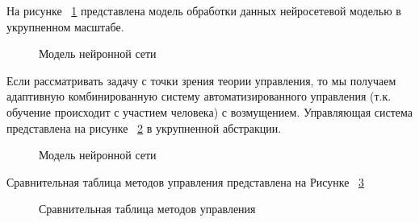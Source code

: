 На рисунке ~\cref{fig:NNproc} представлена модель обработки данных нейросетевой моделью в укрупненном масштабе. 
\begin{figure}[ht]
    \caption{Модель нейронной сети}\label{fig:NNproc}
\end{figure}

Если рассматривать задачу с точки зрения теории управления, то мы получаем адаптивную комбинированную систему автоматизированного управления (т.к. обучение происходит с участием человека) с возмущением. 
Управляющая система представлена на рисунке ~\cref{fig:NNsau} в укрупненной абстракции. 
\begin{figure}[ht]
    \caption{Модель нейронной сети}\label{fig:NNsau}
\end{figure}

Сравнительная таблица методов управления представлена на Рисунке ~\cref{fig:Csau}
\begin{figure}[ht]
    \caption{Сравнительная таблица методов управления}\label{fig:Csau}
\end{figure}

